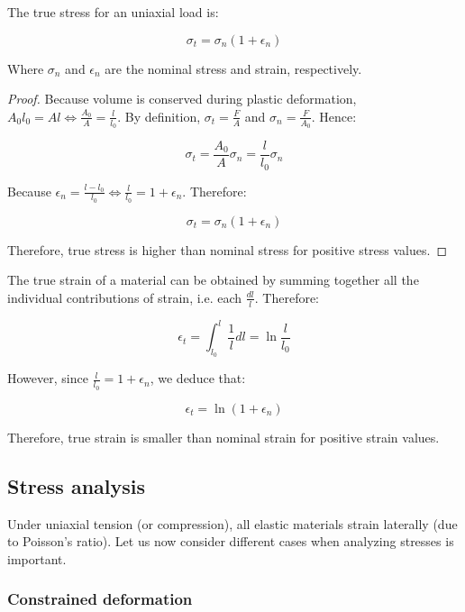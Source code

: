 \documentclass{article}
\begin{document}
\begin{proposition}
    The true stress for an uniaxial load is:

    \[ \sigma_t = \sigma_n(1 + \epsilon_n) \]

    Where $\sigma_n$ and $\epsilon_n$ are the nominal stress and strain, respectively.
\end{proposition}

\begin{proof}
    Because volume is conserved during plastic deformation, $A_0l_0 = Al \iff \frac{A_0}{A} = \frac{l}{l_0}$.
    By definition, $\sigma_t = \frac{F}{A}$ and $\sigma_n = \frac{F}{A_0}$. Hence:

    \[ \sigma_t = \frac{A_0}{A}\sigma_n = \frac{l}{l_0}\sigma_n \]

    Because $\epsilon_n = \frac{l - l_0}{l_0} \iff \frac{l}{l_0} = 1 + \epsilon_n$. Therefore:

    \[ \sigma_t = \sigma_n(1 + \epsilon_n) \]

    Therefore, true stress is higher than nominal stress for positive stress values.
\end{proof}

\begin{proposition}
    The true strain of a material can be obtained by summing together all the individual contributions of strain, i.e. each $\frac{dl}{l}$. Therefore:

    \[ \epsilon_t = \int_{l_0}^l \frac{1}{l}dl = \ln{\frac{l}{l_0}} \]

    However, since $\frac{l}{l_0} = 1 + \epsilon_n$, we deduce that:

    \[ \epsilon_t = \ln{\left(1 + \epsilon_n\right)} \]

    Therefore, true strain is smaller than nominal strain for positive strain values.
\end{proposition}

\subsection{Stress analysis}

Under uniaxial tension (or compression), all elastic materials strain laterally (due to Poisson's ratio). Let us now consider different cases when analyzing stresses is important.

\subsubsection{Constrained deformation}
\end{document}
